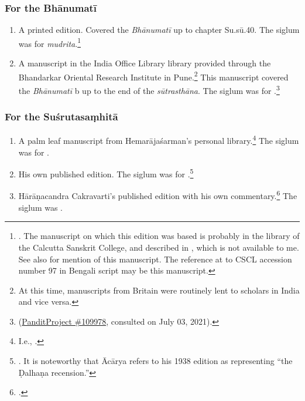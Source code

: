 \subsubsection{For the Bhānumatī}

\begin{enumerate}
    \item A printed edition.  Covered the \emph{Bhānumatī} up to chapter Su.sū.40.
    The siglum was  for \emph{mudrita}.\footnote{\cite{sena-1893}.  The
    manuscript on which this edition was based is probably in the library of the
    Calcutta Sanskrit College, and described in \cite[v.\,X.1]{sast-1917}, which
    is not available to me.  See also \cite[IB, 495, n.\,57]{meul-hist} for
    mention of this manuscript.  The reference at \cite[217]{rao-sans} to CSCL
    accession number 97 in Bengali script may be this manuscript.}
    
    \item A manuscript in the India Office Library library provided through the
    Bhandarkar Oriental Research Institute in Pune.\footnote{At this time,
    manuscripts from Britain were routinely lent to scholars in India and vice
    versa.} This manuscript covered the \emph{Bhānumatī} b up to the end of the
    \emph{sūtrasthāna}.  The siglum was  for
    .\footnote{
    (\href{panditproject.org/entity/109978/manuscript}{PanditProject \#109978},
    consulted on July 03, 2021).}
\end{enumerate}

\subsubsection{For the Suśrutasaṃhitā}

\begin{enumerate}
    \item A palm leaf manuscript from Hemarājaśarman's personal
    library.\footnote{I.e., .}  The siglum was
     for .
    
    \item His own published edition. The siglum was  for .\footnote{\cite{susr-trikamji3}.  It is noteworthy that Ācārya refers to
    his 1938 edition as representing “the Ḍalhaṇa recension.”}
    
    \item Hārāṇacandra Cakravarti's published edition with his own
    commentary.\footcite{bhat-1917} The siglum was .
\end{enumerate}
%
